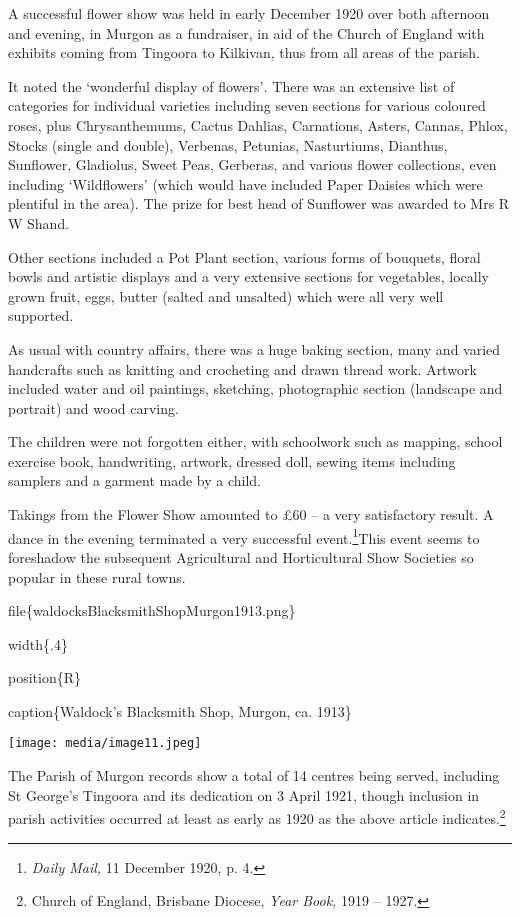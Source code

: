 A successful flower show was held in early December 1920 over both
afternoon and evening, in Murgon as a fundraiser, in aid of the Church
of England with exhibits coming from Tingoora to Kilkivan, thus from all
areas of the parish.

It noted the `wonderful display of flowers'\emph{.} There was an
extensive list of categories for individual varieties including seven
sections for various coloured roses, plus Chrysanthemums, Cactus
Dahlias, Carnations, Asters, Cannas, Phlox, Stocks (single and double),
Verbenas, Petunias, Nasturtiums, Dianthus, Sunflower, Gladiolus, Sweet
Peas, Gerberas, and various flower collections, even including
`Wildflowers' (which would have included Paper Daisies which were
plentiful in the area). The prize for best head of Sunflower was awarded
to Mrs R W Shand.

Other sections included a Pot Plant section, various forms of bouquets,
floral bowls and artistic displays and a very extensive sections for
vegetables, locally grown fruit, eggs, butter (salted and unsalted)
which were all very well supported.

As usual with country affairs, there was a huge baking section, many and
varied handcrafts such as knitting and crocheting and drawn thread work.
Artwork included water and oil paintings, sketching, photographic
section (landscape and portrait) and wood carving.

The children were not forgotten either, with schoolwork such as mapping,
school exercise book, handwriting, artwork, dressed doll, sewing items
including samplers and a garment made by a child.

Takings from the Flower Show amounted to £60 -- a very satisfactory
result. A dance in the evening terminated a very successful
event.\footnote{\emph{Daily Mail,} 11 December 1920, p. 4.}This event
seems to foreshadow the subsequent Agricultural and Horticultural Show
Societies so popular in these rural towns.

file\{waldocksBlacksmithShopMurgon1913.png\}

width\{.4\}

position\{R\}

caption\{Waldock's Blacksmith Shop, Murgon, ca. 1913\}

\texttt{[image: media/image11.jpeg]}

The Parish of Murgon records show a total of 14 centres being served,
including St George's Tingoora and its dedication on 3 April 1921,
though inclusion in parish activities occurred at least as early as 1920
as the above article indicates.\footnote{Church of England, Brisbane
  Diocese, \emph{Year Book,} 1919 -- 1927.}

